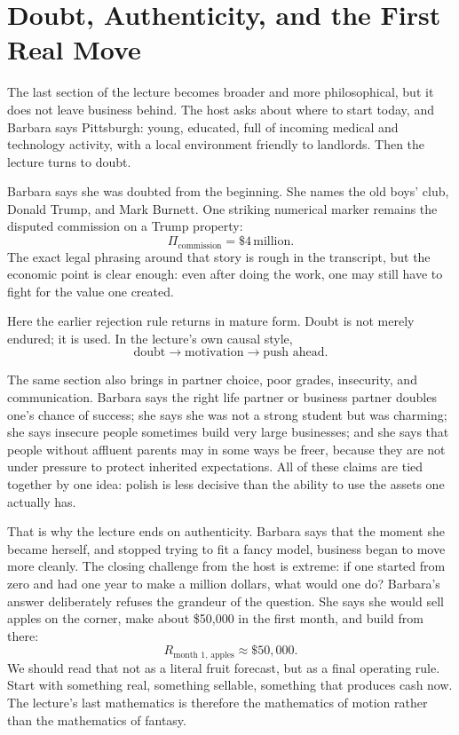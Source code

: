 \section{Doubt, Authenticity, and the First Real Move}

The last section of the lecture becomes broader and more philosophical, but it does not leave business behind. The host asks about where to start today, and Barbara says Pittsburgh: young, educated, full of incoming medical and technology activity, with a local environment friendly to landlords. Then the lecture turns to doubt.

Barbara says she was doubted from the beginning. She names the old boys' club, Donald Trump, and Mark Burnett. One striking numerical marker remains the disputed commission on a Trump property:
\begin{equation}
\Pi_{\text{commission}}=\$4\,\text{million}.
\end{equation}
The exact legal phrasing around that story is rough in the transcript, but the economic point is clear enough: even after doing the work, one may still have to fight for the value one created.

Here the earlier rejection rule returns in mature form. Doubt is not merely endured; it is used. In the lecture's own causal style,
\begin{equation}
\text{doubt}\longrightarrow \text{motivation}\longrightarrow \text{push ahead}.
\end{equation}

The same section also brings in partner choice, poor grades, insecurity, and communication. Barbara says the right life partner or business partner doubles one's chance of success; she says she was not a strong student but was charming; she says insecure people sometimes build very large businesses; and she says that people without affluent parents may in some ways be freer, because they are not under pressure to protect inherited expectations. All of these claims are tied together by one idea: polish is less decisive than the ability to use the assets one actually has.

That is why the lecture ends on authenticity. Barbara says that the moment she became herself, and stopped trying to fit a fancy model, business began to move more cleanly. The closing challenge from the host is extreme: if one started from zero and had one year to make a million dollars, what would one do? Barbara's answer deliberately refuses the grandeur of the question. She says she would sell apples on the corner, make about \$50{,}000 in the first month, and build from there:
\begin{equation}
R_{\text{month 1, apples}}\approx \$50{,}000.
\end{equation}
We should read that not as a literal fruit forecast, but as a final operating rule. Start with something real, something sellable, something that produces cash now. The lecture's last mathematics is therefore the mathematics of motion rather than the mathematics of fantasy.

